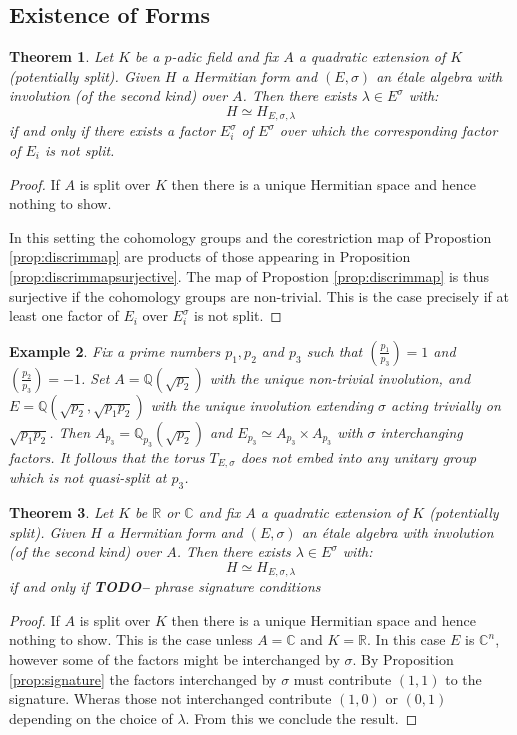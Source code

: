 \documentclass{article}
\theoremstyle{plain}
\newtheorem{theorem}{Theorem}[section]
\newtheorem{example}[theorem]{Example}
\theoremstyle{definition}
\numberwithin{equation}{section}
\newcommand{\RR}{\mathbb{R}}
\newcommand{\CC}{\mathbb{C}}
\newcommand{\QQ}{\mathbb{Q}}
\newcommand{\TODO}[1]{\textbf{TODO-#1}}
\begin{document}
\subsection{Existence of Forms}

\begin{theorem}
Let $K$ be a $p$-adic field and fix $A$ a quadratic extension of $K$ (potentially split).
Given $H$ a Hermitian form and $(E,\sigma)$ an \'etale algebra with involution (of the second kind) over $A$. Then there exists $\lambda \in E^\sigma$ with:
\[ H \simeq H_{E,\sigma,\lambda} \]
if and only if there exists a factor $E_i^\sigma$ of $E^\sigma$ over which the corresponding factor of $E_i$ is not split.
\end{theorem}
\begin{proof}
If $A$ is split over $K$ then there is a unique Hermitian space and hence nothing to show.

In this setting the cohomology groups and the corestriction map of Propostion \ref{prop:discrimmap} are products of those appearing in Proposition \ref{prop:discrimmapsurjective}. The map of Propostion \ref{prop:discrimmap} is thus surjective if the cohomology groups are non-trivial. This is the case precisely if at least one factor of $E_i$ over $E_i^\sigma$ is not split.
\end{proof}

\begin{example}
Fix a prime numbers $p_1,p_2$ and $p_3$ such that $\left(\tfrac{p_1}{p_3}\right) = 1$ and $\left(\tfrac{p_2}{p_3}\right) = -1$.
Set $A=\QQ(\sqrt{p_2})$ with the unique non-trivial involution, and $E=\QQ(\sqrt{p_2},\sqrt{p_1p_2})$ with the unique involution extending $\sigma$ acting trivially on $\sqrt{p_1p_2}$.
Then $A_{p_3} = \QQ_{p_3}(\sqrt{p_2})$ and $E_{p_3} \simeq A_{p_3} \times A_{p_3}$ with $\sigma$ interchanging factors.
It follows that the torus $T_{E,\sigma}$ does not embed into any unitary group which is not quasi-split at $p_3$.
\end{example}

\begin{theorem}
Let $K$ be $\RR$ or $\CC$ and fix $A$ a quadratic extension of $K$ (potentially split).
Given $H$ a Hermitian form and $(E,\sigma)$ an \'etale algebra with involution (of the second kind) over $A$. Then there exists $\lambda \in E^\sigma$ with:
\[ H \simeq H_{E,\sigma,\lambda} \]
if and only if 
\TODO - phrase signature conditions
\end{theorem}
\begin{proof}
If $A$ is split over $K$ then there is a unique Hermitian space and hence nothing to show.
This is the case unless $A=\CC$ and $K=\RR$. In this case $E$ is $\CC^n$, however some of the factors might be interchanged by $\sigma$.
By Proposition \ref{prop:signature} the factors interchanged by $\sigma$ must contribute $(1,1)$ to the signature.
Wheras those not interchanged contribute $(1,0)$ or $(0,1)$ depending on the choice of $\lambda$.
From this we conclude the result.
\end{proof}
\end{document}

